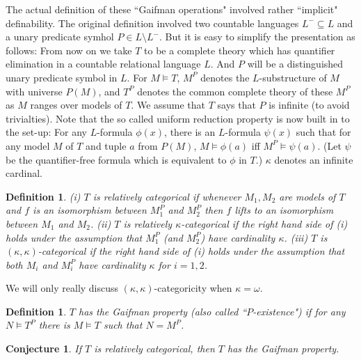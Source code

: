 \documentclass[12pt]{article}
\newtheorem{Definition}[Theorem]{Definition}
\newtheorem{Conjecture}[Theorem]{Conjecture}
\begin{document}
The actual definition of these ``Gaifman operations" involved rather ``implicit" definability.  The original definition involved two countable languages $L^{-}\subseteq L$ and a unary predicate symhol $P\in L\setminus L^{-}$. But it is easy to simplify the presentation as follows:  From now on we take  $T$ to be a complete theory  which has quantifier elimination in a countable relational language $L$. And $P$ will be a distinguished unary predicate symbol in $L$.  For $M\models T$, $M^{P}$ denotes the  $L$-substructure of $M$ with universe $P(M)$, and $T^{P}$ denotes the common complete theory of these $M^{P}$ as $M$ ranges over models of $T$.  
We assume that $T$ says that $P$ is infinite (to avoid trivialties). Note that the so called uniform reduction property is now built in to the set-up:  For any $L$-formula $\phi(x)$, there is an $L$-formula  $\psi(x)$ such that for any model 
$M$ of $T$ and tuple $a$ from $P(M)$, $M\models \phi(a)$ iff $M^{P}\models \psi(a)$. (Let $\psi$ be the quantifier-free formula which is equivalent to $\phi$ in $T$.)
$\kappa$ denotes an infinite cardinal. 
\begin{Definition} (i) $T$ is relatively categorical  if whenever $M_{1}, M_{2}$ are models of $T$ and $f$ is an isomorphism between $M_{1}^{P}$ and $M_{2}^{P}$ then $f$ lifts to an isomorphism between $M_{1}$ and $M_{2}$.
\newline
(ii) $T$ is relatively $\kappa$-categorical if the right hand side of (i) holds under the assumption that $M_{1}^{P}$ (and $M_{2}^{P}$) have cardinality $\kappa$.
\newline
(iii) $T$ is  $(\kappa, \kappa)$-categorical if the right hand side of (i) holds under the assumption that both $M_{i}$ and $M_{i}^{P}$ have cardinality $\kappa$ for $i=1,2$.
\end{Definition}

We will only really discuss $(\kappa,\kappa)$-categoricity when $\kappa = \omega$. 

\begin{Definition} $T$ has the Gaifman property (also called ``$P$-existence")  if for any $N\models T^{P}$ there is $M\models T$ such that $N = M^{P}$.
\end{Definition}

\begin{Conjecture} If $T$ is relatively categorical, then $T$ has the Gaifman property.
\end{Conjecture} 
\end{document}
